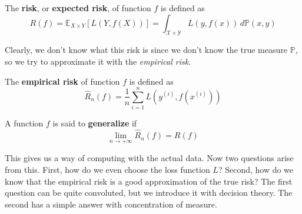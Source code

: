 \begin{definition}[Risk]
  The \textbf{risk}, or \textbf{expected risk}, of function $f$ is defined as 
  \begin{equation}
    R(f) = \mathbb{E}_{X \times Y} [ L(Y, f(X))] = \int_{\mathcal{X} \times \mathcal{Y}} L(y, f(x)) \,d\mathbb{P}(x, y)
  \end{equation}
\end{definition}

Clearly, we don't know what this risk is since we don't know the true measure $\mathbb{P}$, so we try to approximate it with the \textit{empirical risk}. 

\begin{definition}
  The \textbf{empirical risk} of function $f$ is defined as 
  \begin{equation}
    \hat{R}_n(f) = \frac{1}{n} \sum_{i=1}^n L(y^{(i)}, f(x^{(i)}))
  \end{equation}
\end{definition}

\begin{definition}[Generlize]
  A function $f$ is said to \textbf{generalize} if 
  \begin{equation}
    \lim_{n \rightarrow +\infty} \hat{R}_n (f) = R(f)
  \end{equation}
\end{definition}

This gives us a way of computing with the actual data. Now two questions arise from this. First, how do we even choose the loss function $L$? Second, how do we know that the empirical risk is a good approximation of the true risk? The first question can be quite convoluted, but we introduce it with decision theory. The second has a simple answer with concentration of measure.  

